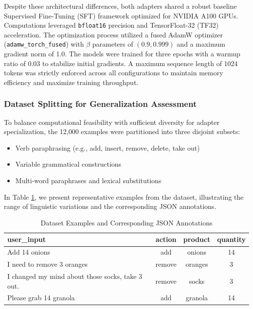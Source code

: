 \documentclass[journal,article,submit,pdftex,moreauthors]{Definitions/mdpi}
\begin{document}
Despite these architectural differences, both adapters shared a robust baseline Supervised Fine-Tuning (SFT) framework optimized for NVIDIA A100 GPUs. Computations leveraged \texttt{bfloat16} precision and TensorFloat-32 (TF32) acceleration. The optimization process utilized a fused AdamW optimizer (\texttt{adamw\_torch\_fused}) with $\beta$ parameters of $(0.9, 0.999)$ and a maximum gradient norm of 1.0. The models were trained for three epochs with a warmup ratio of 0.03 to stabilize initial gradients. A maximum sequence length of 1024 tokens was strictly enforced across all configurations to maintain memory efficiency and maximize training throughput.


\subsubsection{Dataset Splitting for Generalization Assessment}
To balance computational feasibility with sufficient diversity for adapter specialization, the 12,000 examples were partitioned into three disjoint subsets:
\begin{itemize}
    \item Verb paraphrasing (e.g., add, insert, remove, delete, take out)
    \item Variable grammatical constructions
    \item Multi-word paraphrases and lexical substitutions
\end{itemize}

In Table \ref{tab:dataset_examples}, we present representative examples from the dataset, illustrating the range of linguistic variations and the corresponding JSON annotations.

\begin{table}[H]
\caption{Dataset Examples and Corresponding JSON Annotations}
\label{tab:dataset_examples}
\begin{center}
\begin{tabularx}{\textwidth}{Xccc}
\hline
user\_input &	action &	product &	quantity\\
\hline
Add 14 onions &	add &	onions &	14\\
I need to remove 3 oranges &	remove &	oranges &	3\\
I changed my mind about those socks, take 3 out. &	remove &	socks &	3\\
Please grab 14 granola &    add &	granola &	14\\
\hline
\end{tabularx}
\end{center}
\end{table}
\end{document}
